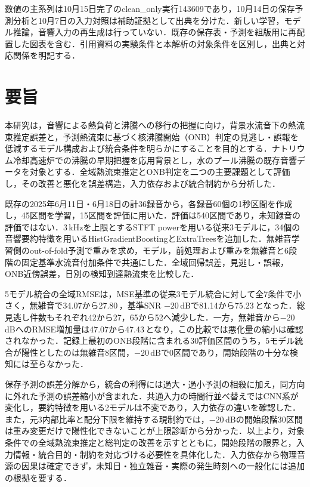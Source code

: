 数値の主系列は10月15日完了のclean\_only実行143609であり，10月14日の保存予測分析と10月7日の入力対照は補助証拠として出典を分けた．新しい学習，モデル推論，音響入力の再生成は行っていない．既存の保存表・予測を組版用に再配置した図表を含む．引用資料の実験条件と本解析の対象条件を区別し，出典と対応関係を明記する．


\chapter*{要旨}
本研究は，音響による熱負荷と沸騰への移行の把握に向け，背景水流音下の熱流束推定誤差と，予測熱流束に基づく核沸騰開始（ONB）判定の見逃し・誤報を低減するモデル構成および統合条件を明らかにすることを目的とする．ナトリウム冷却高速炉での沸騰の早期把握を応用背景とし，水のプール沸騰の既存音響データを対象とする．全域熱流束推定とONB判定を二つの主要課題として評価し，その改善と悪化を誤差構造，入力依存および統合制約から分析した．

既存の2025年6月11日・6月18日の計36録音から，各録音60個の1秒区間を作成し，45区間を学習，15区間を評価に用いた．評価は540区間であり，未知録音の評価ではない．3\,kHzを上限とするSTFT powerを用いる従来3モデルに，34個の音響要約特徴を用いるHistGradientBoostingとExtraTreesを追加した．無雑音学習側のout-of-fold予測で重みを求め，モデル，前処理および重みを無雑音と6段階の固定基準水流音付加条件で共通にした．全域回帰誤差，見逃し・誤報，ONB近傍誤差，日別の検知到達熱流束を比較した．

5モデル統合の全域RMSEは，MSE基準の従来3モデル統合に対して全7条件で小さく，無雑音で34.07から27.80\,\kw{}，基準SNR $-20$\,dBで81.14から75.23\,\kw{}となった．総見逃し件数もそれぞれ42から27，65から52へ減少した．一方，無雑音から$-20$\,dBへのRMSE増加量は47.07から47.43\,\kw{}となり，この比較では悪化量の縮小は確認されなかった．記録上最初のONB段階に含まれる30評価区間のうち，5モデル統合が陽性としたのは無雑音8区間，$-20$\,dBで0区間であり，開始段階の十分な検知には至らなかった．

保存予測の誤差分解から，統合の利得には過大・過小予測の相殺に加え，同方向に外れた予測の誤差縮小が含まれた．共通入力の時間行並べ替えではCNN系が変化し，要約特徴を用いる2モデルは不変であり，入力依存の違いを確認した．また，元3内部比率と配分下限を維持する現制約では，$-20$\,dBの開始段階30区間は重み変更だけで陽性化できないことが上限診断から分かった．以上より，対象条件での全域熱流束推定と総判定の改善を示すとともに，開始段階の限界と，入力情報・統合目的・制約を対応づける必要性を具体化した．入力依存から物理音源の因果は確定できず，未知日・独立雑音・実際の発生時刻への一般化には追加の根拠を要する．

